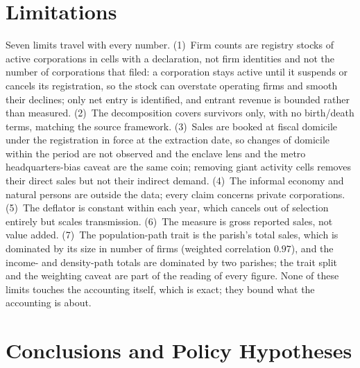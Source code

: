 \documentclass[conference]{IEEEtran}
\begin{document}
\section{Limitations}

Seven limits travel with every number. (1)~Firm counts are registry
stocks of active corporations in cells with a declaration, not firm
identities and not the number of corporations that filed: a corporation stays active until it suspends or cancels its
registration, so the stock can overstate operating firms and smooth their
declines; only net entry is identified, and entrant revenue is bounded
rather than measured. (2)~The decomposition covers survivors only, with
no birth/death terms, matching the source framework. (3)~Sales are booked
at fiscal domicile under the registration in force at the extraction
date, so changes of domicile within the period are not observed and the
enclave lens and the metro headquarters-bias caveat are the same coin;
removing giant activity cells removes their direct sales but not their
indirect demand. (4)~The informal economy and natural persons are outside
the data; every claim concerns private corporations. (5)~The deflator is
constant within each year, which cancels out of selection entirely but
scales transmission. (6)~The measure is gross reported sales, not value
added. (7)~The population-path trait is the parish's total sales, which
is dominated by its size in number of firms (weighted correlation
$0.97$), and the income- and density-path totals are dominated by two
parishes; the trait split and the weighting caveat are part of the
reading of every figure. None of these limits touches the accounting
itself, which is exact; they bound what the accounting is about.

\section{Conclusions and Policy Hypotheses}
\end{document}
